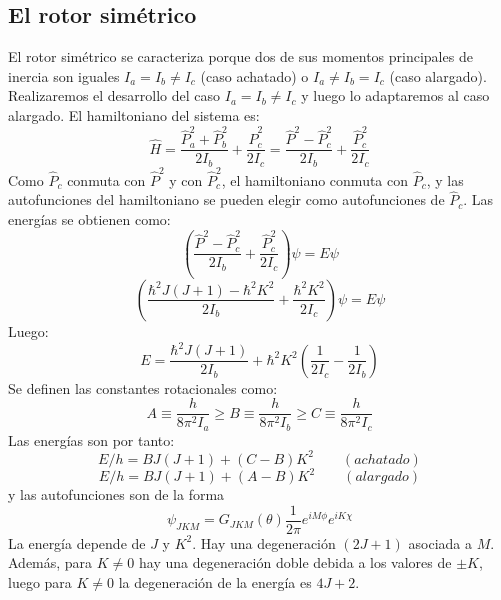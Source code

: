 \documentclass[a4paper]{article}
\begin{document}
\subsection{El rotor simétrico}
El rotor simétrico se caracteriza porque dos de sus momentos principales de inercia son iguales $I_a=I_b\neq I_c$ (caso achatado) o $I_a\neq I_b=I_c$ (caso alargado). Realizaremos el desarrollo del caso $I_a=I_b\neq I_c$ y luego lo adaptaremos al caso alargado. 
El hamiltoniano del sistema es:
\begin{equation}
\hat H=\frac{\hat P_a^2+\hat P_b^2}{2I_b}+\frac{\hat P_c^2}{2I_c}=\frac{\hat P^2- \hat P_c^2}{2I_b}+\frac{\hat P_c^2}{2I_c}
\end{equation}
Como $\hat P_c$ conmuta con $\hat P^2$ y con $\hat P_c^2$, el hamiltoniano conmuta con $\hat P_c$, y las autofunciones del hamiltoniano se pueden elegir como autofunciones de $\hat P_c$.
Las energías se obtienen como: $$\left(\frac{\hat P^2- \hat P_c^2}{2I_b}+\frac{\hat P_c^2}{2I_c}\right)\psi=E\psi$$
 $$\left(\frac{\hbar^2J(J+1)- \hbar^2K^2}{2I_b}+\frac{\hbar^2K^2}{2I_c}\right)\psi=E\psi$$
 Luego:
 \begin{equation}
 E=\frac{\hbar^2J(J+1)}{2I_b}+\hbar^2K^2\left(\frac{1}{2I_c}-\frac{1}{2I_b}\right)
 \end{equation}
 Se definen las constantes rotacionales como:
 \begin{equation}
 A \equiv \frac{h}{8\pi^2I_a}\geq B\equiv \frac{h}{8\pi^2I_b}\geq C\equiv \frac{h}{8\pi^2I_c}
 \end{equation}
 Las energías son por tanto:
 \begin{equation}
 E/h=BJ\left(J+1\right)+\left(C-B\right)K^2 \qquad (achatado)
 \end{equation}
 \begin{equation}
 E/h=BJ\left(J+1\right)+\left(A-B\right)K^2 \qquad (alargado)
 \end{equation}
 y las autofunciones son de la forma
 \begin{equation}
\psi_{JKM}=G_{JKM}(\theta)\frac{1}{2\pi}e^{iM\phi}e^{iK\chi}
\end{equation}
La energía depende de $J$ y $K^2$. Hay una degeneración $(2J+1)$ asociada a $M$. Además, para $K\neq 0$ hay una degeneración doble debida a los valores de $\pm K$, luego para $K\neq 0$ la degeneración de la energía es $4J+2$.
\end{document}
